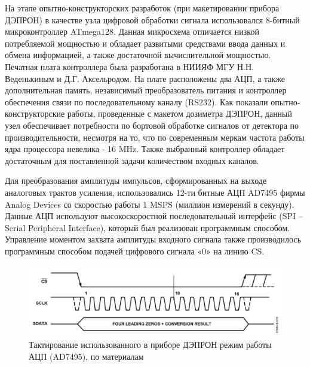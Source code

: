 На этапе опытно-конструкторских разработок (при макетировании прибора ДЭПРОН) в качестве узла цифровой обработки сигнала использовался 8-битный микроконтроллер ATmega128. Данная микросхема отличается низкой потребляемой мощностью и обладает развитыми средствами ввода данных и обмена информацией, а также достаточной вычислительной мощностью. Печатная плата контроллера была разработана в  НИИЯФ МГУ Н.Н. Веденькиным и Д.Г. Аксельродом. На плате расположены два АЦП, а также дополнительная память, независимый преобразователь питания и контроллер обеспечения связи по последовательному каналу (RS232). Как показали опытно-конструкторские работы, проведенные с макетом дозиметра ДЭПРОН, данный узел обеспечивает потребности по бортовой обработке сигналов от детектора по производительности, несмотря на то, что по современным меркам частота работы ядра процессора невелика - 16 MHz. Также выбранный контроллер обладает достаточным для поставленной задачи количеством входных каналов.

Для преобразования амплитуды импульсов, сформированных на выходе аналоговых трактов усиления, использовались 12-ти битные АЦП AD7495 фирмы Analog Devices со скоростью работы 1 MSPS (миллион измерений в секунду). Данные АЦП используют высокоскоростной последовательный интерфейс (SPI -- Serial Peripheral Interface), который был реализован программным способом. Управление моментом захвата амплитуды входного сигнала также производилось программным способом подачей цифрового сигнала «0» на линию CS. 
\begin{figure}
	\centering
	\includegraphics[width=0.7\linewidth]{images/adc}
	\caption{Тактирование использованного в приборе ДЭПРОН режим работы АЦП (AD7495), по материалам \cite{AnalogDevices2005} }
	\label{fig:adc}
\end{figure}

